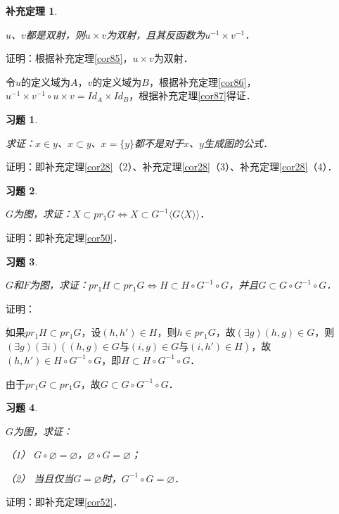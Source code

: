 \documentclass[12pt, a4paper, oneside]{book}
\newtheorem{cor}{补充定理}
\newtheorem{exer}{习题}
\begin{document}
			\begin{cor}\label{cor88}
				\hfill\par
				$u$、$v$都是双射，则$u\times v$为双射，且其反函数为$u^{-1}\times v^{-1}$．
			\end{cor}
			证明：根据补充定理\ref{cor85}，$u\times v$为双射．
			\par
			令$u$的定义域为$A$，$v$的定义域为$B$，根据补充定理\ref{cor86}，$u^{-1}\times v^{-1}\circ u\times v=Id_A\times Id_B$，根据补充定理\ref{cor87}得证．

			\begin{exer}\label{exer43}
				\hfill\par
				求证：$x\in y$、$x\subset y$、$x=\{y\}$都不是对于$x$、$y$生成图的公式．
			\end{exer}
			证明：即补充定理\ref{cor28}（2）、补充定理\ref{cor28}（3）、补充定理\ref{cor28}（4）．

			\begin{exer}\label{exer44}
				\hfill\par
				$G$为图，求证：$X\subset pr_1G\Leftrightarrow X\subset G^{-1}\langle G\langle X \rangle \rangle$．
			\end{exer}
			证明：即补充定理\ref{cor50}．
			
			\begin{exer}\label{exer45}
				\hfill\par
				$G$和$F$为图，求证：$pr_1H\subset pr_1G\Leftrightarrow H\subset H\circ G^{-1}\circ G$，并且$G\subset G\circ G^{-1}\circ G$．
			\end{exer}
			证明：
			\par
			如果$pr_1H\subset pr_1G$，设$(h, h')\in H$，则$h\in pr_1G$，故$(\exists g)(h, g)\in G$，则$(\exists g)(\exists i)((h, g)\in G\text{与}(i, g) \in G\text{与}(i, h') \in H)$，故$(h, h') \in H\circ G^{-1}\circ G$，即$H\subset H\circ G^{-1}\circ G$．
			\par
			由于$pr_1G\subset pr_1G$，故$G\subset G\circ G^{-1}\circ G$．
			
			\begin{exer}\label{exer46}
				\hfill\par
				$G$为图，求证：
				\par
				（1）	$G\circ \varnothing=\varnothing$，$\varnothing\circ G=\varnothing$；
				\par
				（2）	当且仅当$G= \varnothing$时，$G^{-1}\circ G=\varnothing$．
			\end{exer}
			证明：即补充定理\ref{cor52}．
			
\end{document}
